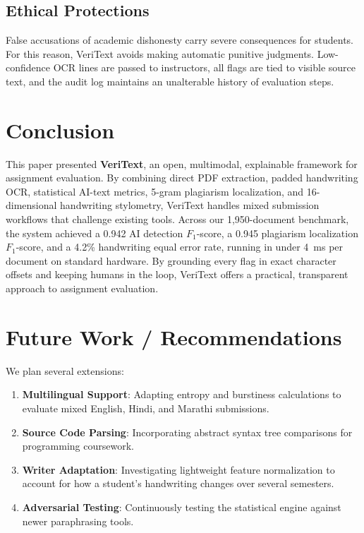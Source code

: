 \documentclass[conference]{IEEEtran}
\begin{document}
\subsection{Ethical Protections}
False accusations of academic dishonesty carry severe consequences for students. For this reason, VeriText avoids making automatic punitive judgments. Low-confidence OCR lines are passed to instructors, all flags are tied to visible source text, and the audit log maintains an unalterable history of evaluation steps.

\section{Conclusion}
This paper presented \textbf{VeriText}, an open, multimodal, explainable framework for assignment evaluation. By combining direct PDF extraction, padded handwriting OCR, statistical AI-text metrics, 5-gram plagiarism localization, and 16-dimensional handwriting stylometry, VeriText handles mixed submission workflows that challenge existing tools. Across our 1,950-document benchmark, the system achieved a 0.942 AI detection $F_1$-score, a 0.945 plagiarism localization $F_1$-score, and a 4.2\% handwriting equal error rate, running in under 4~ms per document on standard hardware. By grounding every flag in exact character offsets and keeping humans in the loop, VeriText offers a practical, transparent approach to assignment evaluation.

\section{Future Work / Recommendations}
We plan several extensions:
\begin{enumerate}
    \item \textbf{Multilingual Support}: Adapting entropy and burstiness calculations to evaluate mixed English, Hindi, and Marathi submissions.
    \item \textbf{Source Code Parsing}: Incorporating abstract syntax tree comparisons for programming coursework.
    \item \textbf{Writer Adaptation}: Investigating lightweight feature normalization to account for how a student's handwriting changes over several semesters.
    \item \textbf{Adversarial Testing}: Continuously testing the statistical engine against newer paraphrasing tools.
\end{enumerate}
\end{document}
